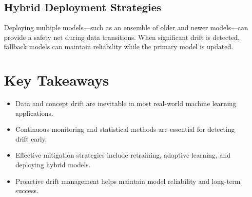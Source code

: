 \documentclass[12pt,openany]{book}
\begin{document}
\subsection{Hybrid Deployment Strategies}
Deploying multiple models—such as an ensemble of older and newer models—can provide a safety net during data transitions. When significant drift is detected, fallback models can maintain reliability while the primary model is updated.



\section{Key Takeaways}

\begin{itemize}
    \item Data and concept drift are inevitable in most real-world machine learning applications.
    \item Continuous monitoring and statistical methods are essential for detecting drift early.
    \item Effective mitigation strategies include retraining, adaptive learning, and deploying hybrid models.
    \item Proactive drift management helps maintain model reliability and long-term success.
\end{itemize}
\end{document}
